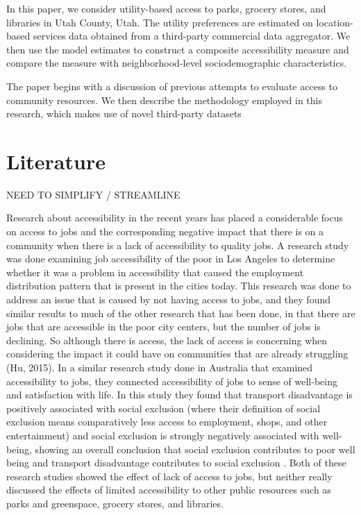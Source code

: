 \documentclass[3p, authoryear]{elsarticle} %
\begin{document}
In this paper, we consider utility-based access to parks, grocery stores, and
libraries in Utah County, Utah. The utility preferences are estimated on
location-based services data obtained from a third-party commercial data
aggregator. We then use the model estimates to construct a composite
accessibility measure and compare the measure with neighborhood-level
sociodemographic characteristics.

The paper begins with a discussion of previous attempts to evaluate
access to community resources. We then describe the methodology employed in
this research, which makes use of novel third-party datasets

\hypertarget{lit-review}{%
\section{Literature}\label{lit-review}}

NEED TO SIMPLIFY / STREAMLINE

Research about accessibility in the recent years has placed a considerable focus
on access to jobs and the corresponding negative impact that there is on a
community when there is a lack of accessibility to quality jobs. A research
study was done examining job accessibility of the poor in Los Angeles to
determine whether it was a problem in accessibility that caused the employment
distribution pattern that is present in the cities today. This research was done
to address an issue that is caused by not having access to jobs, and they found
similar results to much of the other research that has been done, in that there
are jobs that are accessible in the poor city centers, but the number of jobs is
declining. So although there is access, the lack of access is concerning when
considering the impact it could have on communities that are already struggling
(Hu, 2015). In a similar research study done in Australia that examined
accessibility to jobs, they connected accessibility of jobs to sense of
well-being and satisfaction with life. In this study they found that transport
disadvantage is positively associated with social exclusion (where their
definition of social exclusion means comparatively less access to employment,
shops, and other entertainment) and social exclusion is strongly negatively
associated with well-being, showing an overall conclusion that social exclusion
contributes to poor well being and transport disadvantage contributes to social
exclusion \citep{currie2010modeling}. Both of these research studies showed the
effect of lack of access to jobs, but neither really discussed the effects of
limited accessibility to other public resources such as parks and greenspace,
grocery stores, and libraries.
\end{document}
